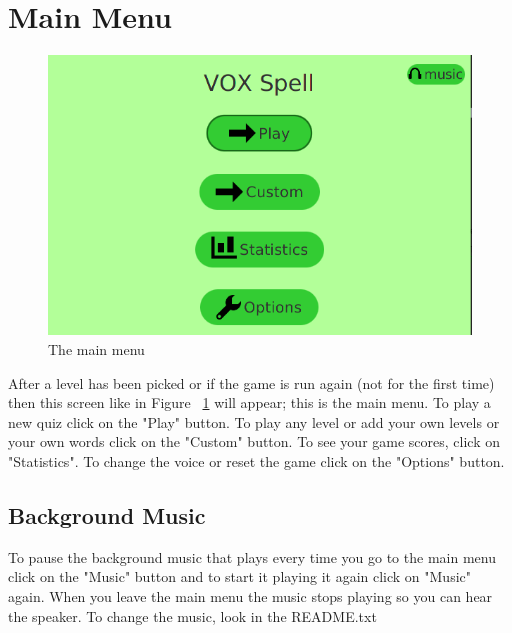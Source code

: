 \documentclass[12pt,a4paper,titlepage,onecolumn]{article}
\begin{document}
	\section{Main Menu}\label{mainmenu}
	\begin{figure}[h]
		\centering
		\includegraphics[width=1\linewidth]{"Figures/Main Menu/MainMenuGeneral"}
		\caption[Main Menu]{The main menu}
		\label{fig:MainMenuGeneral}
	\end{figure}
	After a level has been picked or if the game is run again (not for the first time) then this screen like in Figure ~\ref{fig:MainMenuGeneral} will appear; this is the main menu. To play a new quiz click on the "Play" button. To play any level or add your own levels or your own words click on the "Custom" button. To see your game scores, click on "Statistics". To change the voice or reset the game click on the "Options" button. 
	\subsection{Background Music}
	To pause the background music that plays every time you go to the main menu click on the "Music" button and to start it playing it again click on "Music" again. When you leave the main menu the music stops playing so you can hear the speaker. To change the music, look in the README.txt
	
\end{document}
